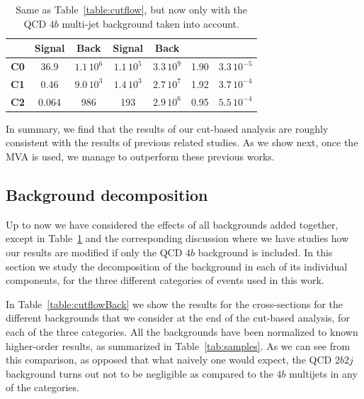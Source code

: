 \begin{table}[t]
\begin{tabular}{c|c|c|c|c|c|c}
      &    Signal & Back   &  Signal  & Back
    &   & \\
    \hline
 {\bf C0}  &  36.9  & $1.1\,10^{6}$ & $1.1\,10^5$ & $3.3\,10^{9}$  &  1.90 & $3.3\,10^{-5}$\\
        {\bf C1}  &  0.46    & $9.0\,10^3$    &  $1.4\,10^3$   & $2.7\,10^7$     & 1.92     &  $3.7\,10^{-4}$ \\
        {\bf C2}  &  0.064     &  986     &  193   &  $2.9\,10^6$    &  0.95  &  $5.5\,10^{-4}$ \\
        \hline
  \end{tabular}
  \caption{\small Same as Table~\ref{table:cutflow}, but now
    only with the QCD $4b$ multi-jet background taken into account.
    \label{table:cutflow4B}
  }
\end{table}


In summary, we find that the results of our cut-based analysis are roughly
consistent with the results of previous related studies.
%
As we show next, once the MVA is used, we manage to outperform these previous
works.




\subsection{Background decomposition}

Up to now we have considered the effects of all backgrounds added
together, except in Table~\ref{table:cutflow4B} and the corresponding
discussion where we have studies how our
results are modified if only the QCD $4b$ background is included.
%
In this section we study the decomposition of the background in each
of its individual components, for the three different categories
of events used in this work.
%

In Table~\ref{table:cutflowBack}   we show the results for the cross-sections for the different
backgrounds that we consider at the end of the cut-based analysis, for each
of the three categories.
%
All the backgrounds have been normalized to known higher-order results,
as summarized in Table~\ref{tab:samples}.
%
As we can see from this comparison, as opposed that what naively one would expect,
the QCD $2b2j$ background turns out not to be negligible as compared to the $4b$
multijets in any of the categories.

